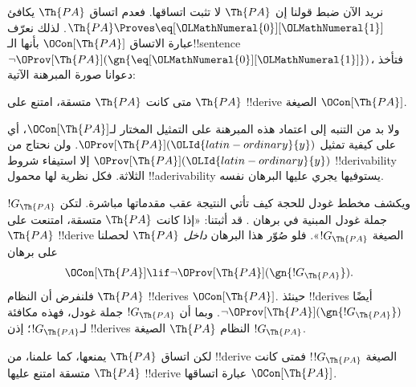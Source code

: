 \documentclass[../../../include/open-logic-section]{subfiles}
\begin{document}


نريد الآن ضبط قولنا إن $\Th{PA}$ لا تثبت اتساقها.
فعدم اتساق $\Th{PA}$ يكافئ $\Th{PA} \Proves \eq[{\OLMathNumeral{0}}][{\OLMathNumeral{1}}]$.
لذلك نعرّف عبارة الاتساق $\OCon[\Th{PA}]$ بأنها
الـ!!{sentence} $\lnot
\OProv[\Th{PA}](\gn{\eq[{\OLMathNumeral{0}}][{\OLMathNumeral{1}}]})$، فتأخذ دعوانا صورة المبرهنة
الآتية:

\begin{thm}
متى كانت $\Th{PA}$ متسقة، امتنع على $\Th{PA}$ !!{derive}
الصيغة $\OCon[\Th{PA}]$.
\end{thm}

ولا بد من التنبه إلى اعتماد هذه المبرهنة على التمثيل المختار
لـ$\OCon[\Th{PA}]$، أي على كيفية تمثيل $\OProv[\Th{PA}]({\OLId{latin-ordinary}{y}})$.
ولن نحتاج من $\OProv[\Th{PA}]({\OLId{latin-ordinary}{y}})$ إلا استيفاء شروط
!!{derivability} الثلاثة. فكل نظرية لها محمول
!!a{derivability} يستوفيها يجري عليها البرهان نفسه.

ويكشف مخطط غودل للحجة كيف تأتي النتيجة عقب مقدماتها مباشرة.
لتكن $!G_\Th{PA}$ جملة غودل المبنية في برهان
. قد أثبتنا: «إذا كانت
$\Th{PA}$ متسقة، امتنعت على $\Th{PA}$ !!{derive} الصيغة
$!G_\Th{PA}$». فلو صُوّر هذا البرهان \emph{داخل} $\Th{PA}$
لحصلنا على برهان
\[
\OCon[\Th{PA}] \lif \lnot \OProv[\Th{PA}](\gn{!G_\Th{PA}}).
\]
فلنفرض أن النظام $\Th{PA}$ !!{derive}s $\OCon[\Th{PA}]$.
حينئذ !!{derive}s أيضًا $\lnot \OProv[\Th{PA}](\gn{!G_\Th{PA}})$.
وبما أن $!G_\Th{PA}$ جملة غودل، فهذه مكافئة لـ$!G_\Th{PA}$؛
إذن !!{derive}s النظام $\Th{PA}$ الصيغة $!G_\Th{PA}$.

لكن اتساق $\Th{PA}$ يمنعها، كما علمنا، من !!{derive}
الصيغة $!G_\Th{PA}$!{} فمتى كانت $\Th{PA}$ متسقة امتنع
عليها !!{derive} عبارة اتساقها $\OCon[\Th{PA}]$.
\end{document}
